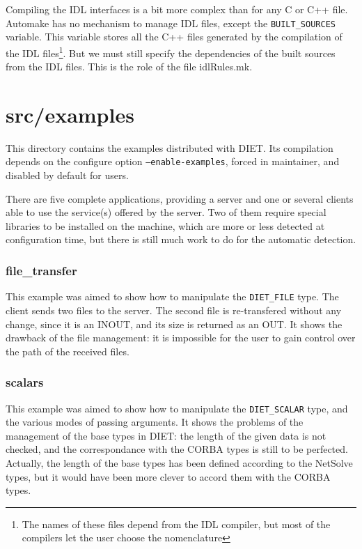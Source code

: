 Compiling the IDL interfaces is a bit more complex than for any C or C++ file.
Automake has no mechanism to manage IDL files, except the
\texttt{BUILT\_SOURCES} variable. This variable stores all the C++ files
generated by the compilation of the IDL files\footnote{The names of these files
  depend from the IDL compiler, but most of the compilers let the user choose
  the nomenclature}. But we must still specify the dependencies of the built
sources from the IDL files. This is the role of the file \textsf{idlRules.mk}.



\section{\textsf{src/examples}}
\label{s:examples}

This directory contains the examples distributed with DIET. Its compilation
depends on the configure option \texttt{--enable-examples}, forced in
maintainer, and disabled by default for users.

There are five complete applications, providing a server and one or several
clients able to use the service(s) offered by the server. Two of them require
special libraries to be installed on the machine, which are more or less
detected at configuration time, but there is still much work to do for
the automatic detection.

\subsubsection{file\_transfer}

This example was aimed to show how to manipulate the \texttt{DIET\_FILE} type.
The client sends two files to the server. The second file is re-transfered
without any change, since it is an INOUT, and its size is returned as an OUT.
It shows the drawback of the file management: it is impossible for the user to
gain control over the path of the received files.

\subsubsection{scalars}

This example was aimed to show how to manipulate the \texttt{DIET\_SCALAR} type,
and the various modes of passing arguments. It shows the problems of the
management of the base types in DIET: the length of the given data is not
checked, and the correspondance with the CORBA types is still to be perfected.
Actually, the length of the base types has been defined according to the
NetSolve types, but it would have been more clever to accord them with the CORBA
types. 

